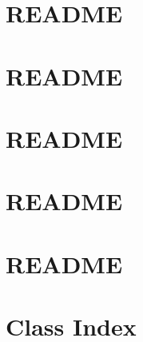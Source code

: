 \documentclass[twoside]{book}
\newcommand{\+}{\discretionary{\mbox{\scriptsize$\hookleftarrow$}}{}{}}
\begin{document}
\chapter{R\+E\+A\+D\+ME}
\label{md_src_Simulate_README}

\chapter{R\+E\+A\+D\+ME}
\label{md_src_Timing_README}

\chapter{R\+E\+A\+D\+ME}
\label{md_src_User_Control_README}

\chapter{R\+E\+A\+D\+ME}
\label{md_src_Vision_README}

\chapter{R\+E\+A\+D\+ME}
\label{md_src_templates_README}

\chapter{Class Index}

\end{document}
